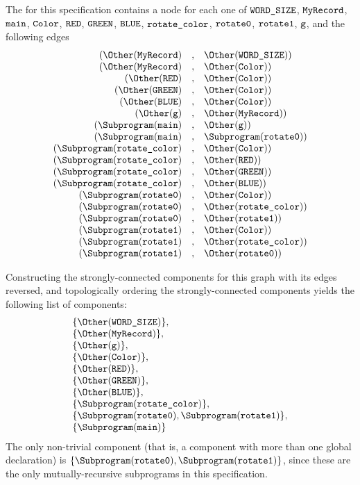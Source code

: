 The \dependencygraphterm{} for this specification contains a node for each one of
$\texttt{WORD\_SIZE}$, $\texttt{MyRecord}$, $\texttt{main}$,
$\texttt{Color}$, $\texttt{RED}$, $\texttt{GREEN}$, $\texttt{BLUE}$,
$\texttt{rotate\_color}$, $\texttt{rotate0}$, $\texttt{rotate1}$, $\texttt{g}$,
and the following edges
\[
\begin{array}{rcl}
  (\Other(\MyRecord)    &,& \Other(\vWORDSIZE))\\
  (\Other(\MyRecord)    &,& \Other(\Color))\\
  (\Other(\RED)       &,& \Other(\Color))\\
  (\Other(\GREEN)       &,& \Other(\Color))\\
  (\Other(\BLUE)       &,& \Other(\Color))\\
  (\Other(\vg)       &,& \Other(\MyRecord))\\
  (\Subprogram(\vmain)  &,& \Other(\vg))\\
  (\Subprogram(\vmain)  &,& \Subprogram(\rotatezero))\\
  (\Subprogram(\rotatecolor)   &,& \Other(\Color))\\
  (\Subprogram(\rotatecolor)   &,& \Other(\RED))\\
  (\Subprogram(\rotatecolor)   &,& \Other(\GREEN))\\
  (\Subprogram(\rotatecolor)   &,& \Other(\BLUE))\\
  (\Subprogram(\rotatezero)    &,& \Other(\Color))\\
  (\Subprogram(\rotatezero)    &,& \Other(\rotatecolor))\\
  (\Subprogram(\rotatezero)    &,& \Other(\rotateone))\\
  (\Subprogram(\rotateone)     &,& \Other(\Color))\\
  (\Subprogram(\rotateone)     &,& \Other(\rotatecolor))\\
  (\Subprogram(\rotateone)     &,& \Other(\rotatezero))\\
\end{array}
\]

Constructing the strongly-connected components for this graph with its edges reversed,
and topologically ordering the strongly-connected components yields the following list of
components:
\[
\begin{array}{l}
  \{ \Other(\vWORDSIZE) \},\\
  \{ \Other(\MyRecord) \},\\
  \{ \Other(\vg) \},\\
  \{ \Other(\Color) \},\\
  \{ \Other(\RED) \},\\
  \{ \Other(\GREEN) \},\\
  \{ \Other(\BLUE) \},\\
  \{ \Subprogram(\rotatecolor) \},\\
  \{ \Subprogram(\rotatezero), \Subprogram(\rotateone) \},\\
  \{ \Subprogram(\vmain) \}
\end{array}
\]
The only non-trivial component (that is, a component with more than one global declaration)
is $\{ \Subprogram(\rotatezero), \Subprogram(\rotateone) \}$, since these are the only
mutually-recursive subprograms in this specification.

